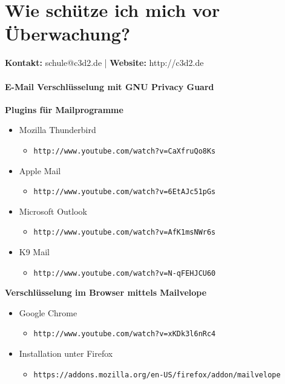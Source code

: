 \documentclass[a5paper]{scrartcl}
\begin{document}
\thispagestyle{empty}

\part*{Wie schütze ich mich vor Überwachung?}
\textbf{Kontakt:} schule@c3d2.de | \textbf{Website:} http://c3d2.de
\vspace{5mm}

\subsection*{E-Mail Verschlüsselung mit GNU Privacy Guard}
\textbf{Plugins für Mailprogramme}
\begin{itemize}
   \item Mozilla Thunderbird
      \begin{itemize}
         \item[] \texttt{http://www.youtube.com/watch?v=CaXfruQo8Ks}  
      \end{itemize}       
   \item Apple Mail 
      \begin{itemize}
         \item[] \texttt{http://www.youtube.com/watch?v=6EtAJc51pGs}  
      \end{itemize}
   \item Microsoft Outlook 
      \begin{itemize}
         \item[] \texttt{http://www.youtube.com/watch?v=AfK1msNWr6s} 
      \end{itemize}
   \item K9 Mail
      \begin{itemize}
         \item[] \texttt{http://www.youtube.com/watch?v=N-qFEHJCU60} 
      \end{itemize}
\end{itemize}
\textbf{Verschlüsselung im Browser mittels Mailvelope}
\begin{itemize}
   \item Google Chrome
      \begin{itemize}
         \item[] \texttt{http://www.youtube.com/watch?v=xKDk3l6nRc4}
      \end{itemize}
   \item Installation unter Firefox
      \begin{itemize}
         \item[] \footnotesize{\texttt{https://addons.mozilla.org/en-US/firefox/addon/mailvelope}} 
      \end{itemize}
\end{itemize}
\end{document}

